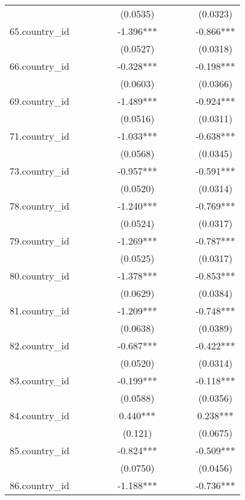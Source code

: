 \documentclass[]{article}
\begin{document}
\begin{tabular}{lccccccccc}
 &  &  &  &  & (0.0535) &  &  &  & (0.0323) \\
65.country\_id &  &  &  &  & -1.396*** &  &  &  & -0.866*** \\
 &  &  &  &  & (0.0527) &  &  &  & (0.0318) \\
66.country\_id &  &  &  &  & -0.328*** &  &  &  & -0.198*** \\
 &  &  &  &  & (0.0603) &  &  &  & (0.0366) \\
69.country\_id &  &  &  &  & -1.489*** &  &  &  & -0.924*** \\
 &  &  &  &  & (0.0516) &  &  &  & (0.0311) \\
71.country\_id &  &  &  &  & -1.033*** &  &  &  & -0.638*** \\
 &  &  &  &  & (0.0568) &  &  &  & (0.0345) \\
73.country\_id &  &  &  &  & -0.957*** &  &  &  & -0.591*** \\
 &  &  &  &  & (0.0520) &  &  &  & (0.0314) \\
78.country\_id &  &  &  &  & -1.240*** &  &  &  & -0.769*** \\
 &  &  &  &  & (0.0524) &  &  &  & (0.0317) \\
79.country\_id &  &  &  &  & -1.269*** &  &  &  & -0.787*** \\
 &  &  &  &  & (0.0525) &  &  &  & (0.0317) \\
80.country\_id &  &  &  &  & -1.378*** &  &  &  & -0.853*** \\
 &  &  &  &  & (0.0629) &  &  &  & (0.0384) \\
81.country\_id &  &  &  &  & -1.209*** &  &  &  & -0.748*** \\
 &  &  &  &  & (0.0638) &  &  &  & (0.0389) \\
82.country\_id &  &  &  &  & -0.687*** &  &  &  & -0.422*** \\
 &  &  &  &  & (0.0520) &  &  &  & (0.0314) \\
83.country\_id &  &  &  &  & -0.199*** &  &  &  & -0.118*** \\
 &  &  &  &  & (0.0588) &  &  &  & (0.0356) \\
84.country\_id &  &  &  &  & 0.440*** &  &  &  & 0.238*** \\
 &  &  &  &  & (0.121) &  &  &  & (0.0675) \\
85.country\_id &  &  &  &  & -0.824*** &  &  &  & -0.509*** \\
 &  &  &  &  & (0.0750) &  &  &  & (0.0456) \\
86.country\_id &  &  &  &  & -1.188*** &  &  &  & -0.736*** \\

\end{tabular}
\end{document}
